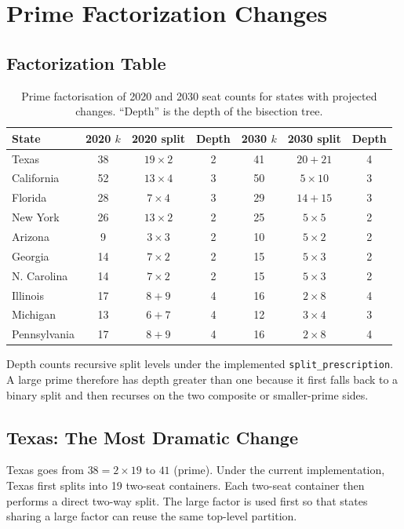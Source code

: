 \section{Prime Factorization Changes}
\label{sec:factorization}

\subsection{Factorization Table}

\begin{table}[h]
\centering
\caption{Prime factorisation of 2020 and 2030 seat counts for states
         with projected changes. ``Depth'' is the depth of the \ar{}
         bisection tree.}
\label{tab:factorization}
\begin{tabular}{lcccccc}
\toprule
State & 2020 $k$ & 2020 split & Depth & 2030 $k$ & 2030 split & Depth \\
\midrule
Texas & 38 & $19\times2$ & 2 & 41 & $20+21$ & 4 \\
California & 52 & $13\times4$ & 3 & 50 & $5\times10$ & 3 \\
Florida & 28 & $7\times4$ & 3 & 29 & $14+15$ & 3 \\
New York & 26 & $13\times2$ & 2 & 25 & $5\times5$ & 2 \\
Arizona & 9 & $3\times3$ & 2 & 10 & $5\times2$ & 2 \\
Georgia & 14 & $7\times2$ & 2 & 15 & $5\times3$ & 2 \\
N. Carolina & 14 & $7\times2$ & 2 & 15 & $5\times3$ & 2 \\
Illinois & 17 & $8+9$ & 4 & 16 & $2\times8$ & 4 \\
Michigan & 13 & $6+7$ & 4 & 12 & $3\times4$ & 3 \\
Pennsylvania & 17 & $8+9$ & 4 & 16 & $2\times8$ & 4 \\
\bottomrule
\end{tabular}
\end{table}

Depth counts recursive split levels under the implemented
\texttt{split\_prescription}.  A large prime therefore has depth greater than
one because it first falls back to a binary split and then recurses on the two
composite or smaller-prime sides.

\subsection{Texas: The Most Dramatic Change}

Texas goes from $38 = 2 \times 19$ to $41$ (prime).
Under the current implementation, Texas first splits into 19 two-seat
containers.  Each two-seat container then performs a direct two-way split.
The large factor is used first so that states sharing a large factor can reuse
the same top-level partition.


